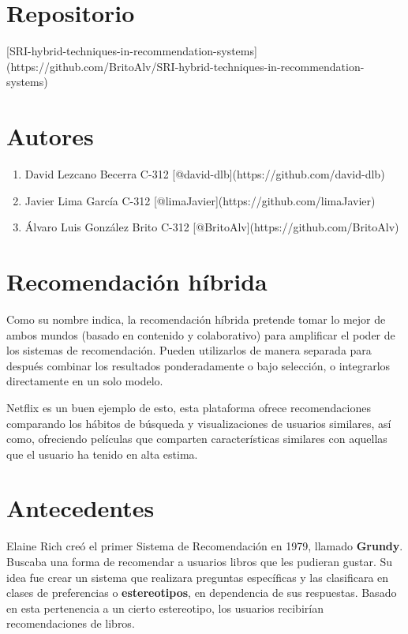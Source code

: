\documentclass[14pt]{extarticle}
\begin{document}
\section{Repositorio}

[SRI-hybrid-techniques-in-recommendation-systems](https://github.com/BritoAlv/SRI-hybrid-techniques-in-recommendation-systems)

\section{Autores}
\begin{enumerate}
    \item David Lezcano Becerra C-312 [@david-dlb](https://github.com/david-dlb)
    \item Javier Lima García C-312 [@limaJavier](https://github.com/limaJavier)
    \item Álvaro Luis González Brito C-312 [@BritoAlv](https://github.com/BritoAlv)
\end{enumerate}


\section{Recomendación híbrida}

Como su nombre indica, la recomendación híbrida pretende tomar lo mejor de ambos mundos (basado en contenido y colaborativo) para amplificar el poder de los sistemas de recomendación. Pueden utilizarlos de manera separada para después combinar los resultados ponderadamente o bajo selección, o integrarlos directamente en un solo modelo.

Netflix es un buen ejemplo de esto, esta plataforma ofrece recomendaciones comparando los hábitos de búsqueda y visualizaciones de usuarios similares, así como, ofreciendo películas que comparten características similares con aquellas que el usuario ha tenido en alta estima.

\section{Antecedentes}

Elaine Rich creó el primer Sistema de Recomendación en 1979, llamado \textbf{Grundy}. Buscaba una forma de recomendar a usuarios libros que les pudieran gustar. Su idea fue crear un sistema que realizara preguntas específicas y las clasificara en clases de preferencias o \textbf{estereotipos}, en dependencia de sus respuestas. Basado en esta pertenencia a un cierto estereotipo, los usuarios recibirían recomendaciones de libros.
\end{document}
